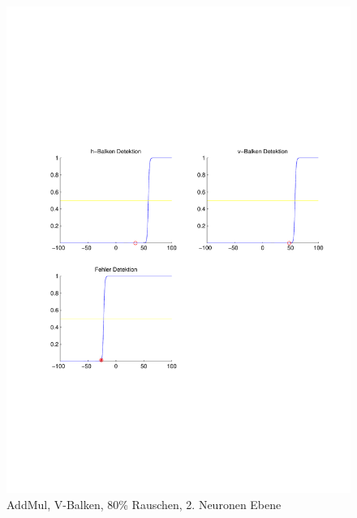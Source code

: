 \begin{figure}[hbt]
\begin{minipage}{0.8 \textwidth}
		\includegraphics[width=\textwidth]{./Bilder/Auswertung/Endergebnis/TypeAddMul_Rauschen80_V_Line_Layer2}
		\caption{AddMul, V-Balken, 80\% Rauschen, 2. Neuronen Ebene}
		\label{AddMul_V_80_2}
	\end{minipage}
\end{figure}
\clearpage

